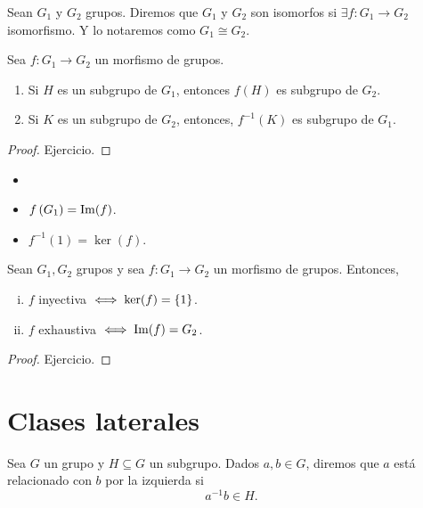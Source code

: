 \begin{defi}
    Sean $G_1$ y $G_2$ grupos. Diremos que $G_1$ y $G_2$ son isomorfos si $\exists f \colon G_1 \to G_2$
    isomorfismo. Y lo notaremos como $G_1\cong G_2$.
\end{defi}

\begin{prop}
    Sea $f \colon G_1 \to G_2$ un morfismo de grupos.
    \begin{enumerate}
        \item Si $H$ es un subgrupo de $G_1$, entonces $f(H)$ es subgrupo de $G_2$.
        \item Si $K$ es un subgrupo de $G_2$, entonces, $f^{-1}(K)$ es subgrupo de $G_1$.
    \end{enumerate}
\end{prop}

\begin{proof}
    Ejercicio.
\end{proof}

\begin{obs}
    \begin{itemize}
        \item[]
        \item $f\left( G_1 \right) = \operatorname{Im}(f)$.
        \item $f^{-1}(1) = \ker(f)$.
    \end{itemize}
\end{obs}

\begin{prop} Sean $G_1, G_2$ grupos y sea $f\colon G_1\to G_2$ un morfismo de grupos. Entonces,
    \begin{enumerate}[i)]
        \item $f$ inyectiva $\iff \ker(f) = \left\{1\right\}$.
        \item $f$ exhaustiva $\iff \operatorname{Im}(f) = G_2$.
    \end{enumerate}
\end{prop}

\begin{proof}
    Ejercicio.
\end{proof}

\section{Clases laterales}

\begin{defi}
    Sea $G$ un grupo y $H \subseteq G$ un subgrupo. Dados $a, b \in G$, diremos que
    $a$ está relacionado con $b$ por la izquierda si
    \[
        a^{-1}b \in H.
    \]
\end{defi}

